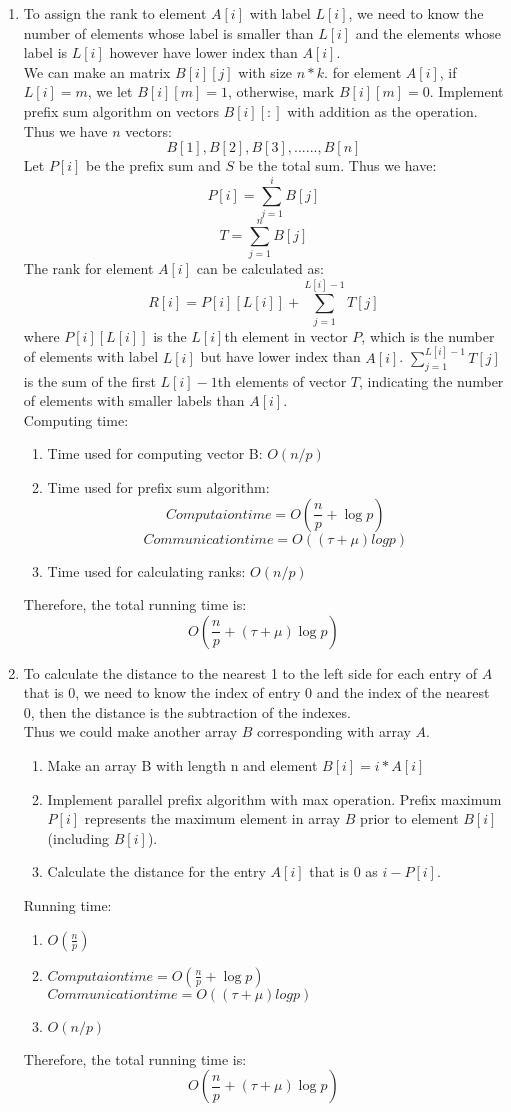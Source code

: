 \documentclass[twoside,12pt]{article}
\begin{document}
\begin{enumerate}
\item To assign the rank to element $ A[i] $ with label $ L[i] $, we need to know the number of elements whose label is smaller than $ L[i] $ and the elements whose label is $ L[i] $ however have lower index than $ A[i] $. \\
We can make an matrix $ B[i][j] $ with size $ n*k $. for element $ A[i] $, if  $ L[i]=m $, we let $ B[i][m]=1 $, otherwise, mark $ B[i][m]=0 $. Implement prefix sum algorithm on vectors $ B[i][:] $ with addition as the operation. Thus we have $ n $ vectors: 
\[ B[1], B[2],B[3],......,B[n]  \]
Let $ P[i] $ be the prefix sum and $ S $ be the total sum. Thus we have:
\[ P[i]=\sum_{j=1}^{i}B[j] \]
\[ T=\sum_{j=1}^{n}B[j] \]
The rank for element $ A[i] $ can be calculated as:
\[ R[i]=P[i][L[i]]+\sum_{j=1}^{L[i]-1}T[j] \] where
$ P[i][L[i]] $ is the $ L[i] $th element in vector $ P $, which is the number of elements with label $ L[i] $ but have lower index than  $ A[i] $. $ \sum_{j=1}^{L[i]-1}T[j] $ is the sum of the first $ L[i]-1 $th elements of vector $ T $, indicating the number of elements with smaller labels than  $ A[i] $.\\
Computing time:
\begin{enumerate}
	\item Time used for computing vector B: $ O(n/p) $
	\item Time used for prefix sum algorithm:
	 \[ Computaion time = O(\frac{n}{p}+\log p) \] 
	 \[ Communication time = O((\tau+\mu)log p) \]
	\item Time used for calculating ranks: $ O(n/p) $
\end{enumerate}
Therefore, the total running time is:
\[ O(\frac{n}{p}+(\tau+\mu)\log p) \]


\item To calculate the distance to the nearest 1 to the left side for each entry of $ A $ that is 0, we need to know the index of entry 0 and the index of the nearest 0, then the distance is the subtraction of the indexes. \\
Thus we could make another array $ B $ corresponding with array $ A $. 
\begin{enumerate}
	\item Make an array B with length n and element $ B[i]=i*A[i] $
	\item Implement parallel prefix algorithm with max operation. Prefix maximum $ P[i] $ represents the maximum element in array $ B $ prior to element $ B[i] $ (including $ B[i] $).
	\item Calculate the distance for the entry $ A[i] $ that is 0 as $ i-P[i] $.
\end{enumerate}
Running time:
\begin{enumerate}
	\item $ O(\frac{n}{p}) $
	\item 	 $Computaion time = O(\frac{n}{p}+\log p) $ \\
	$ Communication time = O((\tau+\mu)log p) $
	\item $ O(n/p) $
\end{enumerate}
Therefore, the total running time is:
\[ O(\frac{n}{p}+(\tau+\mu)\log p) \]

\end{enumerate}

     
\end{document}
